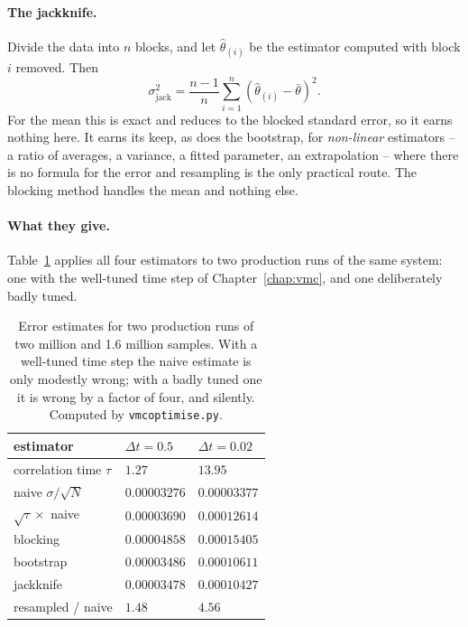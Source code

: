 \paragraph{The jackknife.}
Divide the data into $n$ blocks, and let $\hat\theta_{(i)}$ be the estimator
computed with block $i$ removed.  Then
\begin{equation}
  \sigma^2_{\mathrm{jack}}
   = \frac{n-1}{n}\sum_{i=1}^{n}
     \left(\hat\theta_{(i)} - \bar{\theta}\right)^2 .
  \label{eq:14-jackknife}
\end{equation}
For the mean this is exact and reduces to the blocked standard error, so it
earns nothing here.  It earns its keep, as does the bootstrap, for
\emph{non-linear} estimators -- a ratio of averages, a variance, a fitted
parameter, an extrapolation -- where there is no formula for the error and
resampling is the only practical route.  The blocking method handles the mean
and nothing else.

\paragraph{What they give.}
Table~\ref{tab:14-resampling} applies all four estimators to two production
runs of the same system: one with the well-tuned time step of
Chapter~\ref{chap:vmc}, and one deliberately badly tuned.

\begin{table}[h]
\centering
\renewcommand{\arraystretch}{1.25}
\setlength{\tabcolsep}{12pt}
\begin{tabular}{lll}
\toprule
estimator & $\Delta t = 0.5$ & $\Delta t = 0.02$\\
\midrule
correlation time $\tau$ & $1.27$ & $13.95$\\
\midrule
naive $\sigma/\sqrt{N}$ & $0.00003276$ & $0.00003377$\\
$\sqrt{\tau}\times$ naive & $0.00003690$ & $0.00012614$\\
blocking & $0.00004858$ & $0.00015405$\\
bootstrap & $0.00003486$ & $0.00010611$\\
jackknife & $0.00003478$ & $0.00010427$\\
\midrule
resampled / naive & $1.48$ & $4.56$\\
\bottomrule
\end{tabular}
\caption{Error estimates for two production runs of two million and 1.6
million samples.  With a well-tuned time step the naive estimate is only
modestly wrong; with a badly tuned one it is wrong by a factor of four, and
silently.  Computed by \texttt{vmcoptimise.py}.}
\label{tab:14-resampling}
\end{table}

